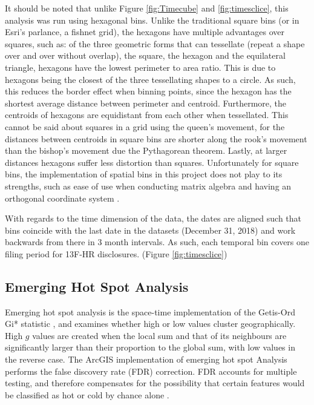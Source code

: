 It should be noted that unlike Figure \ref{fig:Timecube} and \ref{fig:timesclice}, this analysis was run using hexagonal bins. Unlike the traditional square bins (or in Esri's parlance, a fishnet grid), the hexagons have multiple advantages over squares, such as:  of the three geometric forms that can tessellate (repeat a shape over and over without overlap), the  square, the hexagon and the equilateral triangle, hexagons have the lowest perimeter to area ratio.  This is due to hexagons being the closest of the three tessellating shapes to a circle.  As such, this reduces the border effect when binning points, since the hexagon has the shortest average distance between perimeter and centroid.  Furthermore, the centroids of hexagons are equidistant from each other when tessellated.  This cannot be said about squares in a grid using the queen's movement, for the distances between centroids in square bins are shorter along the rook's movement than the bishop's movement due the Pythagorean theorem.  Lastly, at larger distances hexagons suffer less distortion than squares.  Unfortunately for square bins, the implementation of spatial bins in this project does not play to its strengths, such as ease of use when conducting matrix algebra and having an orthogonal coordinate system \citep{birch2007rectangular}. 

With regards to the time dimension of the data, the dates are aligned such that bins coincide with the last date in the datasets (December 31, 2018) and work backwards from there in 3 month intervals.  As such, each temporal bin covers one filing period for 13F-HR disclosures.  (Figure \ref{fig:timesclice})

\subsection{Emerging Hot Spot Analysis}

Emerging hot spot analysis is the space-time implementation of the Getis-Ord Gi* statistic \citep{getis2010analysis}, and examines whether high or low values cluster geographically.  High $g$ values are created when the local sum and that of its neighbours are significantly larger than their proportion to the global sum, with low values in the reverse case. The ArcGIS implementation of emerging hot spot Analysis performs the false discovery rate (FDR) correction.  FDR accounts for multiple testing, and therefore compensates for the possibility that certain features would be classified as hot or cold by chance alone \citep{Esri}.

